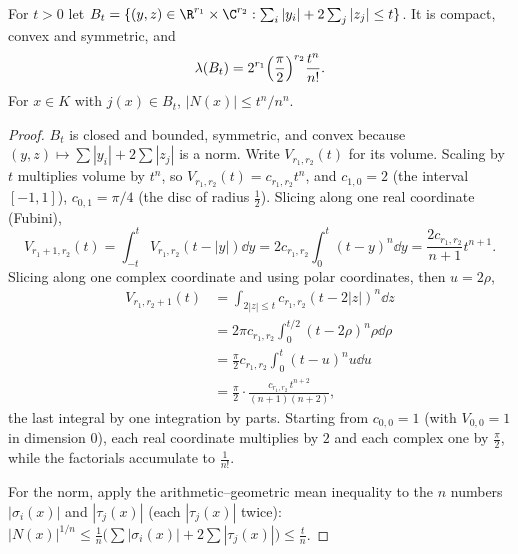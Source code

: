 \begin{lemma}\label{lem:volume}
For $t>0$ let $B_t=\{(y,z)\in\R^{r_1}\times\C^{r_2}:\sum_i|y_i|+2\sum_j|z_j|\le t\}$. It is compact, convex and
symmetric, and
\[
\lambda(B_t)=2^{r_1}\Bigl(\frac\pi2\Bigr)^{r_2}\frac{t^n}{n!}.
\]
For $x\in K$ with $j(x)\in B_t$, $|N(x)|\le t^n/n^n$.
\end{lemma}
\begin{proof}
$B_t$ is closed and bounded, symmetric, and convex because $(y,z)\mapsto\sum|y_i|+2\sum|z_j|$ is a norm. Write
$V_{r_1,r_2}(t)$ for its volume. Scaling by $t$ multiplies volume by $t^n$, so $V_{r_1,r_2}(t)=c_{r_1,r_2}t^n$, and
$c_{1,0}=2$ (the interval $[-1,1]$), $c_{0,1}=\pi/4$ (the disc of radius $\frac12$). Slicing along one real coordinate
(Fubini),
\[
V_{r_1+1,r_2}(t)=\int_{-t}^tV_{r_1,r_2}(t-|y|)\dd y=2c_{r_1,r_2}\int_0^t(t-y)^n\dd y=\frac{2c_{r_1,r_2}}{n+1}t^{n+1}.
\]
Slicing along one complex coordinate and using polar coordinates, then $u=2\rho$,
\begin{align*}
V_{r_1,r_2+1}(t)&=\int_{2|z|\le t}c_{r_1,r_2}(t-2|z|)^n\dd z\\
&=2\pi c_{r_1,r_2}\int_0^{t/2}(t-2\rho)^n\rho\dd\rho\\
&=\frac\pi2c_{r_1,r_2}\int_0^t(t-u)^nu\dd u\\
&=\frac\pi2\cdot\frac{c_{r_1,r_2}\,t^{n+2}}{(n+1)(n+2)},
\end{align*}
the last integral by one integration by parts. Starting from $c_{0,0}=1$ (with $V_{0,0}=1$ in dimension $0$), each real
coordinate multiplies by $2$ and each complex one by $\frac\pi2$, while the factorials accumulate to $\frac1{n!}$.

For the norm, apply the arithmetic--geometric mean inequality to the $n$ numbers $|\sigma_i(x)|$ and $|\tau_j(x)|$ (each
$|\tau_j(x)|$ twice): $|N(x)|^{1/n}\le\frac1n\bigl(\sum|\sigma_i(x)|+2\sum|\tau_j(x)|\bigr)\le\frac tn$.
\end{proof}


